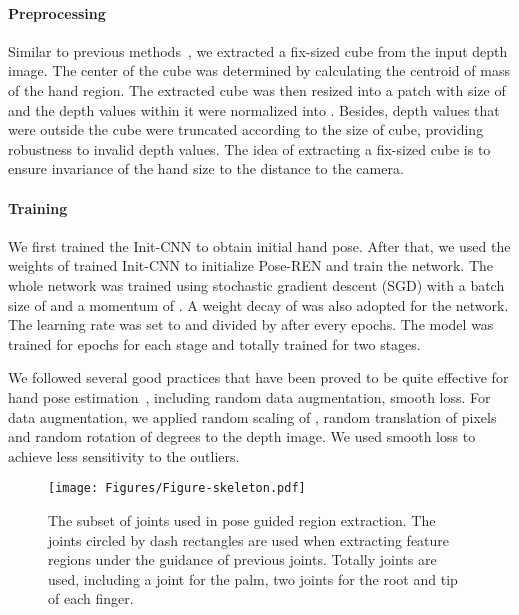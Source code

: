 \documentclass[final, 5p]{elsarticle}
\begin{document}
\paragraph{\textbf{Preprocessing}} Similar to previous methods~\cite{oberweger2015training, guo2017region}, we extracted a fix-sized cube from the input depth image. The center of the cube was determined by calculating the centroid of mass of the hand region. The extracted cube was then resized into a patch with size of  and the depth values within it were normalized into . Besides, depth values that were outside the cube were truncated according to the size of cube, providing robustness to invalid depth values. The idea of extracting a fix-sized cube is to ensure invariance of the hand size to the distance to the camera.

\paragraph{\textbf{Training}} We first trained the Init-CNN to obtain initial hand pose. After that, we used the weights of trained Init-CNN to initialize Pose-REN and train the network. The whole network was trained using stochastic gradient descent (SGD) with a batch size of  and a momentum of . A weight decay of  was also adopted for the network. The learning rate was set to  and divided by  after every  epochs. The model was trained for  epochs for each stage and totally trained for two stages.

We followed several good practices that have been proved to be quite effective for hand pose estimation~\cite{guo2017region}, including random data augmentation, smooth  loss. For data augmentation, we applied random scaling of , random translation of  pixels and random rotation of  degrees to the depth image. We used smooth  loss to achieve less sensitivity to the outliers.

\begin{figure}[!tb]
  \centering
    \centerline{\texttt{[image: Figures/Figure-skeleton.pdf]}}
  \caption{The subset of joints used in pose guided region extraction. The joints circled by dash rectangles are used when extracting feature regions under the guidance of previous joints. Totally  joints are used, including a joint for the palm, two joints for the root and tip of each finger.}
\label{fig:skeleton-setting}
\end{figure}
\end{document}
